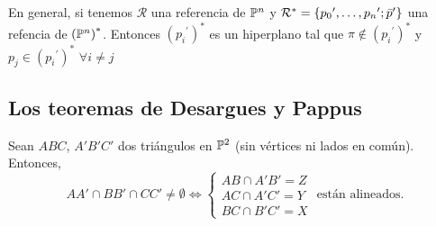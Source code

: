 \begin{obs}
En general, si tenemos $\mathcal{R}$ una referencia de $\mathbb{P}^n$ y 
$\mathcal{R}^* = \left\{{p_0}^\prime,\dots,{p_n}^\prime; \bar{p}^\prime\right\}$
una refencia de $\left( \mathbb{P}^n \right)^*$. Entonces $\left( {p_i}^\prime \right)^*$
es un hiperplano tal que $\pi \notin \left( {p_i}^\prime \right)^*$ y
$p_j \in \left( {p_i}^\prime \right)^*$ $\forall i \neq j$
\end{obs}


\subsection{Los teoremas de Desargues y Pappus}

\begin{thm}[de Desargues]

Sean $ABC$, $A'B'C'$ dos triángulos en $\mathbb{P}^2$ (sin vértices ni lados en común). Entonces,
\[
AA' \cap BB' \cap CC' \neq \emptyset \iff
\begin{cases}
AB \cap A'B' = Z \\
AC \cap A'C' = Y \\
BC \cap B'C' = X
\end{cases}
\text{ están alineados.}
\]


\end{thm}

